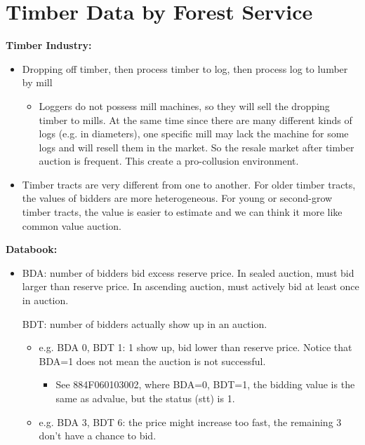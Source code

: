 \documentclass{book}
\theoremstyle{plain}
\theoremstyle{definition}
\begin{document}

\section{Timber Data by Forest Service} %
\label{sec:timber_data}

\noindent
\textbf{Timber Industry:}
\begin{itemize}
	\item Dropping off timber, then process timber to log, then process log to lumber by mill
	\begin{itemize}
		\item Loggers do not possess mill machines, so they will sell the dropping timber to mills. At the same time since there are many different kinds of logs (e.g. in diameters), one specific mill may lack the machine for some logs and will resell them in the market. So the resale market after timber auction is frequent. This create a pro-collusion environment.
	\end{itemize}

	\item Timber tracts are very different from one to another. For older timber tracts, the values of bidders are more heterogeneous. For young or second-grow timber tracts, the value is easier to estimate and we can think it more like common value auction.
\end{itemize}

\vspace{1em}
\noindent
\textbf{Databook:}
\begin{itemize}
	\item BDA: number of bidders bid excess reserve price. In sealed auction, must bid larger than reserve price. In ascending auction, must actively bid at least once in auction.
	
	BDT: number of bidders actually show up in an auction.
	\begin{itemize}
		\item e.g. BDA 0, BDT 1: 1 show up, bid lower than reserve price. Notice that BDA=1 does not mean the auction is not successful.

		\begin{itemize}
			\item See 884F060103002, where BDA=0, BDT=1, the bidding value is the same as advalue, but the status (stt) is 1.
		\end{itemize}
		\item e.g. BDA 3, BDT 6: the price might increase too fast, the remaining 3 don't have a chance to bid.
	\end{itemize}
\end{itemize}
\end{document}
